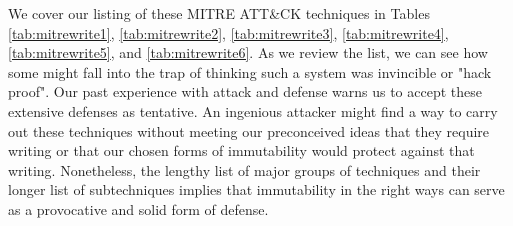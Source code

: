 We cover our listing of these MITRE ATT\&CK techniques in Tables \ref{tab:mitrewrite1}, \ref{tab:mitrewrite2}, \ref{tab:mitrewrite3}, \ref{tab:mitrewrite4}, \ref{tab:mitrewrite5}, and \ref{tab:mitrewrite6}.  As we review the list, we can see how some might fall into the trap of thinking such a system was invincible or "hack proof".  Our past experience with \gls{attack} and defense warns us to accept these extensive defenses as tentative.  An ingenious attacker might find a way to carry out these techniques without meeting our preconceived ideas that they require writing or that our chosen forms of immutability would protect against that writing.  Nonetheless, the lengthy list of major groups of techniques and their longer list of subtechniques implies that immutability in the right ways can serve as a provocative and solid form of defense.




